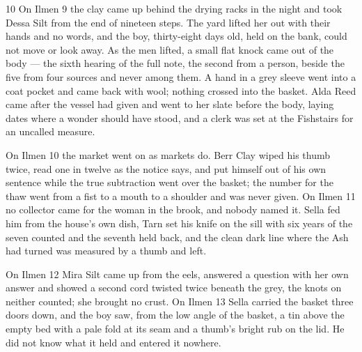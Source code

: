 






\CRtailpiece
\begin{CRchronicle}{10}
On Ilmen 9 the clay came up behind the drying racks in the night and took Dessa Silt from the end of nineteen steps. The yard lifted her out with their hands and no words, and the boy, thirty-eight days old, held on the bank, could not move or look away. As the men lifted, a small flat knock came out of the body --- the sixth hearing of the full note, the second from a person, beside the five from four sources and never among them. A hand in a grey sleeve went into a coat pocket and came back with wool; nothing crossed into the basket. Alda Reed came after the vessel had given and went to her slate before the body, laying dates where a wonder should have stood, and a clerk was set at the Fishstairs for an uncalled measure.

On Ilmen 10 the market went on as markets do. Berr Clay wiped his thumb twice, read one in twelve as the notice says, and put himself out of his own sentence while the true subtraction went over the basket; the number for the thaw went from a fist to a mouth to a shoulder and was never given. On Ilmen 11 no collector came for the woman in the brook, and nobody named it. Sella fed him from the house’s own dish, Tarn set his knife on the sill with six years of the seven counted and the seventh held back, and the clean dark line where the Ash had turned was measured by a thumb and left.

On Ilmen 12 Mira Silt came up from the eels, answered a question with her own answer and showed a second cord twisted twice beneath the grey, the knots on neither counted; she brought no crust. On Ilmen 13 Sella carried the basket three doors down, and the boy saw, from the low angle of the basket, a tin above the empty bed with a pale fold at its seam and a thumb’s bright rub on the lid. He did not know what it held and entered it nowhere.


\end{CRchronicle}
